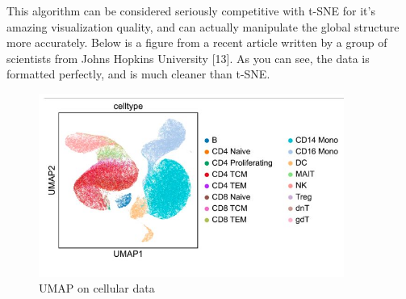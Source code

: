 \documentclass[12pt]{article}
\begin{document}
This algorithm can be considered seriously competitive with t-SNE for it's amazing visualization quality, and can actually manipulate the global structure more accurately. Below is a figure from a recent article written by a group of scientists from Johns Hopkins University [13]. As you can see, the data is formatted perfectly, and is much cleaner than t-SNE. 

\begin{figure}[h!]
\centering    
\includegraphics[width=100mm]{umap pic.jpg}
\caption{UMAP on cellular data}
\label{fig: UMAP}
\end{figure}
\end{document}
